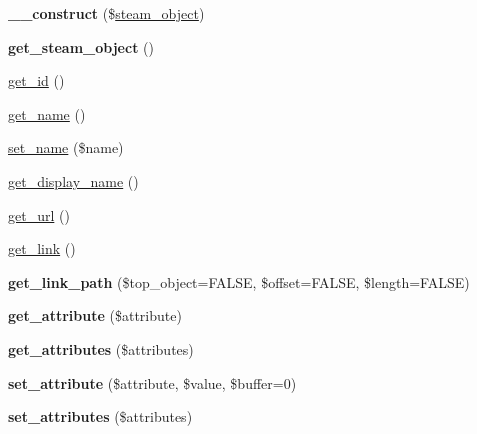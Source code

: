 \begin{DoxyCompactItemize}
\item 
\hypertarget{classkoala__object_aa5dd0070dc0e9b0a5c1e385f3fd4a9f8}{
{\bfseries \_\-\_\-construct} (\$\hyperlink{classsteam__object}{steam\_\-object})}
\label{classkoala__object_aa5dd0070dc0e9b0a5c1e385f3fd4a9f8}

\item 
\hypertarget{classkoala__object_ae7c40c08c1c332919d968c2e8e8c9931}{
{\bfseries get\_\-steam\_\-object} ()}
\label{classkoala__object_ae7c40c08c1c332919d968c2e8e8c9931}

\item 
\hyperlink{classkoala__object_aad901883f7fe2ae837f18720b4676306}{get\_\-id} ()
\item 
\hyperlink{classkoala__object_aa2a31792717f7865ab1326a332cad10e}{get\_\-name} ()
\item 
\hyperlink{classkoala__object_a181d6888b29f52f4e36abd2911efbf2a}{set\_\-name} (\$name)
\item 
\hyperlink{classkoala__object_a3cb2dd24644a08383e0112ca6e5369dc}{get\_\-display\_\-name} ()
\item 
\hyperlink{classkoala__object_a99cf45b0f26a28d0069521e54e24bfde}{get\_\-url} ()
\item 
\hyperlink{classkoala__object_a19d4d030ae0d38eccdcaae41ae0d071f}{get\_\-link} ()
\item 
\hypertarget{classkoala__object_ad650d91e55b70783347403107d25de5c}{
{\bfseries get\_\-link\_\-path} (\$top\_\-object=FALSE, \$offset=FALSE, \$length=FALSE)}
\label{classkoala__object_ad650d91e55b70783347403107d25de5c}

\item 
\hypertarget{classkoala__object_a33ae90599b4c4ab1011d8c49dd5b99a9}{
{\bfseries get\_\-attribute} (\$attribute)}
\label{classkoala__object_a33ae90599b4c4ab1011d8c49dd5b99a9}

\item 
\hypertarget{classkoala__object_a28a53bf1994702b8e9b191983ea4fde5}{
{\bfseries get\_\-attributes} (\$attributes)}
\label{classkoala__object_a28a53bf1994702b8e9b191983ea4fde5}

\item 
\hypertarget{classkoala__object_afbbd4edbc36b0bd96a3764c6a6a9937c}{
{\bfseries set\_\-attribute} (\$attribute, \$value, \$buffer=0)}
\label{classkoala__object_afbbd4edbc36b0bd96a3764c6a6a9937c}

\item 
\hypertarget{classkoala__object_a1d05a72ca12256840db3ed3451c87aac}{
{\bfseries set\_\-attributes} (\$attributes)}
\label{classkoala__object_a1d05a72ca12256840db3ed3451c87aac}


\end{DoxyCompactItemize}
